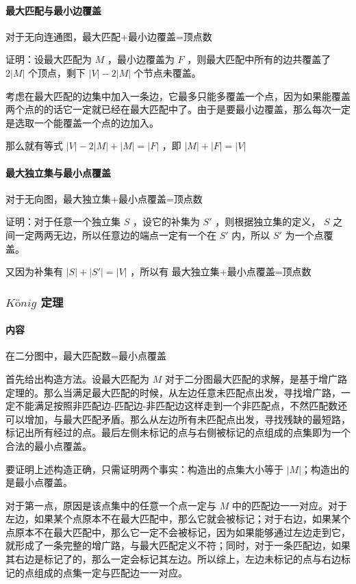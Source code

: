 \documentclass[UTF-8]{ctexart}
\begin{document}
			\paragraph{最大匹配与最小边覆盖} 对于无向连通图，最大匹配+最小边覆盖=顶点数
			
			证明：设最大匹配为 $M$ ，最小边覆盖为 $F$ ，则最大匹配中所有的边共覆盖了 $2|M|$ 个顶点，剩下 $|V|-2|M|$ 个节点未覆盖。
			
			考虑在最大匹配的边集中加入一条边，它最多只能多覆盖一个点，因为如果能覆盖两个点的的话它一定就已经在最大匹配中了。由于是要最小边覆盖，那么每次一定是选取一个能覆盖一个点的边加入。
			
			那么就有等式 $|V|-2|M|+|M|=|F|$ ，即 $|M|+|F|=|V|$
			
			\paragraph{最大独立集与最小点覆盖} 对于无向图，最大独立集+最小点覆盖=顶点数
			
			证明：对于任意一个独立集 $S$ ，设它的补集为 $S'$ ，则根据独立集的定义， $S$ 之间一定两两无边，所以任意边的端点一定有一个在 $S'$ 内，所以 $S'$ 为一个点覆盖。
			
			又因为补集有 $|S|+|S'|=|V|$ ，所以有 最大独立集+最小点覆盖=顶点数
			
			\subsubsection{$König$ 定理}
			\paragraph{内容} 在二分图中，最大匹配数=最小点覆盖
			
			首先给出构造方法。设最大匹配为 $M$ 对于二分图最大匹配的求解，是基于增广路定理的。那么当满足最大匹配的时候，从左边任意未匹配点出发，寻找增广路，一定不能满足按照非匹配边-匹配边-非匹配边这样走到一个非匹配点，不然匹配数还可以增加，与最大匹配矛盾。那么从左边所有未匹配点出发，寻找残缺的最短路，标记出所有经过的点。最后左侧未标记的点与右侧被标记的点组成的点集即为一个合法的最小点覆盖。
			
			要证明上述构造正确，只需证明两个事实：构造出的点集大小等于 $|M|$；构造出的是最小点覆盖。
			
			对于第一点，原因是该点集中的任意一个点一定与 $M$ 中的匹配边一一对应。对于左边，如果某个点原本不在最大匹配中，那么它就会被标记；对于右边，如果某个点原本不在最大匹配中，那么它一定不会被标记，因为如果能够通过左边走到它，就形成了一条完整的增广路，与最大匹配定义不符；同时，对于一条匹配边，如果其右边是标记了的，那么一定会标记其左边。所以综上，左边未标记的点与右边标记的点组成的点集一定与匹配边一一对应。
			
\end{document}

